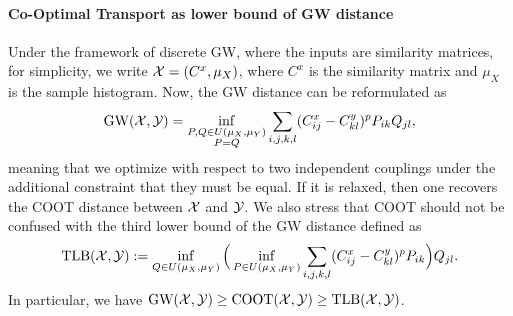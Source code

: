 \paragraph{Co-Optimal Transport as lower bound of GW distance} \label{subsec:GWLB}
Under the framework of discrete GW, where the inputs are similarity matrices, for simplicity,
we write $\mathcal X = (C^x, \mu_X)$, where $C^x$ is the similarity matrix and
$\mu_X$ is the sample histogram. Now, the GW distance can be reformulated as
\begin{align}
  \label{eq:discrete_gw_coot}
  \text{GW}(\mathcal X, \mathcal Y) =
  \inf_{\substack{P, Q \in U(\mu_X, \mu_Y) \\ P=Q}}
  \sum_{i,j,k,l} (C^x_{ij} - C^y_{kl})^p P_{ik} Q_{jl},
\end{align}
meaning that we optimize with respect to two independent couplings
under the additional constraint that they must be equal. If it is relaxed, then
one recovers the COOT distance between $\mathcal X$ and $\mathcal Y$. We also stress that COOT should not
be confused with the third lower bound of the GW distance \citep{Memoli07,Memoli11} defined as
\begin{equation}
  \text{TLB}(\mathcal X, \mathcal Y) :=
  \inf_{Q \in U(\mu_X, \mu_Y)}
  \Big( \inf_{P \in U(\mu_X, \mu_Y)} \sum_{i,j,k,l} (C^x_{ij} - C^y_{kl})^p P_{ik} \Big) Q_{jl}.
\end{equation}
In particular, we have $\text{GW}(\mathcal X, \mathcal Y) \geq \text{COOT}(\mathcal X, \mathcal Y) \geq \text{TLB}(\mathcal X, \mathcal Y)$.

